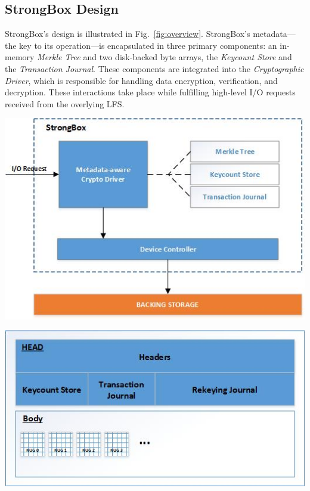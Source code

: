 \documentclass[a0,portrait]{a0poster}
\newcommand{\PAD}{\vskip 0.75cm}
\newcommand{\figref}[1]{Fig.~\ref{fig:#1}}
\begin{document}
\begin{multicols}{2}
\vspace{-1cm}


\color{DarkSlateGray} %

\section*{StrongBox Design}

StrongBox's design is illustrated in \figref{overview}. StrongBox's metadata---
the key to its operation---is encapsulated in three primary components: an in-
memory \emph{Merkle Tree} and two disk-backed byte arrays, the \emph{Keycount
Store} and the \emph{Transaction Journal}. These components are integrated into
the \emph{Cryptographic Driver}, which is responsible for handling data
encryption, verification, and decryption. These interactions take place while
fulfilling high-level I/O requests received from the overlying LFS.

\begin{minipage}{0.6\columnwidth}
\PAD 
\centering
\includegraphics{overview}
\label{fig:overview}
\PAD 
\end{minipage}
\begin{minipage}{0.4\columnwidth}
\PAD 
\centering
\includegraphics{backstore}
\label{fig:backstore}
\PAD 
\end{minipage}


\end{multicols}
\end{document}
